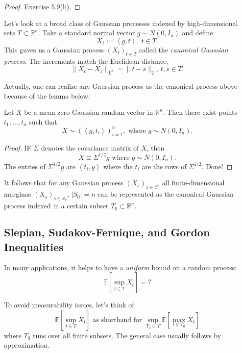 \begin{proof}
Exercise 5.9(b).
\end{proof}

Let's look at a broad class of Gaussian processes indexed by high-dimensional sets $T \subset \mathbb{R}^n$. 
Take a standard normal vector $g \sim N(0, I_n)$ and define 
\[ X_t := \left\langle g, t \right\rangle, \ t \in T. \]
This guves us a Gaussian process $(X_t)_{t \in T}$ called the \textit{canonical Gaussian process}. The 
increments match the Euclidean distance: 
\[ \lVert X_t - X_s \rVert_{L^2} = \lVert t - s \rVert_{2}, \ t, s \in T. \]

Actually, one can realize any Gaussian process as the canonical process above because of the lemma below:
\begin{lemma}
\label{lem:7.1.12}
Let $X$ be a mean-zero Gaussian random vector in $\mathbb{R}^n$. Then there exist points $t_1, \dots, t_n$ such 
that 
\[ X \sim (\left\langle g, t_i \right\rangle)_{i = 1}^n, \text{ where } g \sim N(0, I_n). \]
\end{lemma}

\begin{proof}
IF $\Sigma$ denotes the covariance matrix of $X$, then 
\[ X \equiv \Sigma^{1/2}g \text{ where } g \sim N(0, I_n). \]
The entries of $\Sigma^{1/2}g$ are $\left\langle t_i, g \right\rangle$ where the $t_i$ are the rows of 
$\Sigma^{1/2}$. Done!
\end{proof}

It follows that for any Gaussian process $(X_s)_{x \in S}$, all finite-dimensional marginas $(X_s)_{s \in S_0}$, 
$|S_0| = n$ can be represented as the canonical Gaussian process indexed in a certain subset 
$T_0 \subset \mathbb{R}^n$.



\subsection{Slepian, Sudakov-Fernique, and Gordon Inequalities}
In many applications, it helps to have a \textit{uniform} bound on a random process:
\[ \mathbb{E}\left[ \sup_{t \in T} X_t \right] = ? \]

\begin{remark}
\label{rmk:7.2.1}
To avoid measurability issues, let's think of 
\[ \mathbb{E}\left[ \sup_{t \in T} X_t \right] \text{ as shorthand for } 
\sup_{T_0 \subset T} \mathbb{E}\left[ \max_{t \in T_0} X_t \right] \]
where $T_0$ runs over all finite subsets. The general case usually follows by approximation.
\end{remark}

